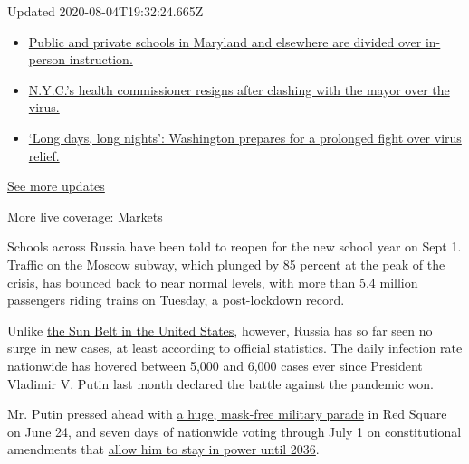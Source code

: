 Updated 2020-08-04T19:32:24.665Z

\begin{itemize}
\tightlist
\item
  \href{https://www.nytimes3xbfgragh.onion/2020/08/04/world/coronavirus-cases.html?action=click\&pgtype=Article\&state=default\&region=MAIN_CONTENT_1\&context=storylines_live_updates\#link-4825b93}{Public
  and private schools in Maryland and elsewhere are divided over
  in-person instruction.}
\item
  \href{https://www.nytimes3xbfgragh.onion/2020/08/04/world/coronavirus-cases.html?action=click\&pgtype=Article\&state=default\&region=MAIN_CONTENT_1\&context=storylines_live_updates\#link-4d1eafa8}{N.Y.C.'s
  health commissioner resigns after clashing with the mayor over the
  virus.}
\item
  \href{https://www.nytimes3xbfgragh.onion/2020/08/04/world/coronavirus-cases.html?action=click\&pgtype=Article\&state=default\&region=MAIN_CONTENT_1\&context=storylines_live_updates\#link-6b644638}{`Long
  days, long nights': Washington prepares for a prolonged fight over
  virus relief.}
\end{itemize}

\href{https://www.nytimes3xbfgragh.onion/2020/08/04/world/coronavirus-cases.html?action=click\&pgtype=Article\&state=default\&region=MAIN_CONTENT_1\&context=storylines_live_updates}{See
more updates}

More live coverage:
\href{https://www.nytimes3xbfgragh.onion/live/2020/08/04/business/stock-market-today-coronavirus?action=click\&pgtype=Article\&state=default\&region=MAIN_CONTENT_1\&context=storylines_live_updates}{Markets}

Schools across Russia have been told to reopen for the new school year
on Sept 1. Traffic on the Moscow subway, which plunged by 85 percent at
the peak of the crisis, has bounced back to near normal levels, with
more than 5.4 million passengers riding trains on Tuesday, a
post-lockdown record.

Unlike
\href{https://www.nytimes3xbfgragh.onion/2020/06/14/us/coronavirus-united-states.html}{the
Sun Belt in the United States}, however, Russia has so far seen no surge
in new cases, at least according to official statistics. The daily
infection rate nationwide has hovered between 5,000 and 6,000 cases ever
since President Vladimir V. Putin last month declared the battle against
the pandemic won.

Mr. Putin pressed ahead with
\href{https://www.nytimes3xbfgragh.onion/2020/06/24/world/europe/russia-coronavirus-parade.html}{a
huge, mask-free military parade} in Red Square on June 24, and seven
days of nationwide voting through July 1 on constitutional amendments
that
\href{https://www.nytimes3xbfgragh.onion/2020/07/01/world/europe/putin-referendum-vote-russia.html}{allow
him to stay in power until 2036}.


